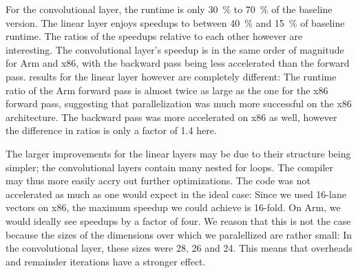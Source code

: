 \documentclass{article}
\numberwithin{equation}{section}
\numberwithin{figure}{section}
\numberwithin{table}{section}
\begin{document}
    For the convolutional layer, the runtime is only \SI{30}{\percent} to \SI{70}{\percent} of the baseline version. The
    linear layer enjoys speedups to between \SI{40}{\percent} and \SI{15}{\percent} of baseline runtime.
    The ratios of the speedups relative to each other however are interesting. The convolutional layer's speedup is in
    the same order of magnitude for Arm and x86, with the backward pass being less accelerated than the forward pass.
    results for the linear layer however are completely different: The runtime ratio of the Arm forward pass is almost
    twice as large as the one for the x86 forward pass, suggesting that parallelization was much more successful on the
    x86 architecture. The backward pass was more accelerated on x86 as well, however the difference in ratios is only a
    factor of \num{1.4} here.

    The larger improvements for the linear layers may be due to their structure being simpler; the convolutional layers contain
    many nested for loops. The compiler may thus more easily accry out further optimizations. The code was not accelerated as
    much as one would expect in the ideal case: Since we used 16-lane vectors on x86, the maximum speedup we could achieve is
    16-fold. On Arm, we would ideally see speedups by a factor of four. We reason that this is not the case because the sizes
    of the dimensions over which we paralellized are rather small: In the convolutional layer, these sizes were \num{28},
    \num{26} and \num{24}. This means that overheads and remainder iterations have a stronger effect.

    \printbibliography[heading=bibintoc]
\end{document}
